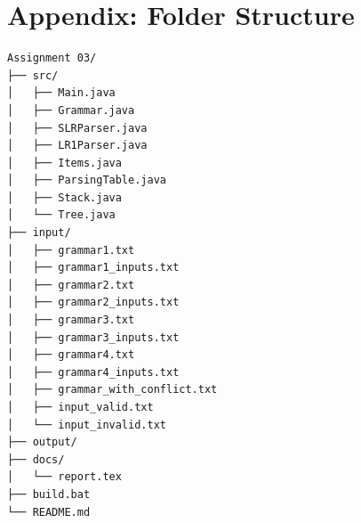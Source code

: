 \documentclass[12pt]{article}
\begin{document}
\section*{Appendix: Folder Structure}

\begin{lstlisting}[style=reportstyle]
Assignment 03/
├── src/
│   ├── Main.java
│   ├── Grammar.java
│   ├── SLRParser.java
│   ├── LR1Parser.java
│   ├── Items.java
│   ├── ParsingTable.java
│   ├── Stack.java
│   └── Tree.java
├── input/
│   ├── grammar1.txt
│   ├── grammar1_inputs.txt
│   ├── grammar2.txt
│   ├── grammar2_inputs.txt
│   ├── grammar3.txt
│   ├── grammar3_inputs.txt
│   ├── grammar4.txt
│   ├── grammar4_inputs.txt
│   ├── grammar_with_conflict.txt
│   ├── input_valid.txt
│   └── input_invalid.txt
├── output/
├── docs/
│   └── report.tex
├── build.bat
└── README.md
\end{lstlisting}
\end{document}
